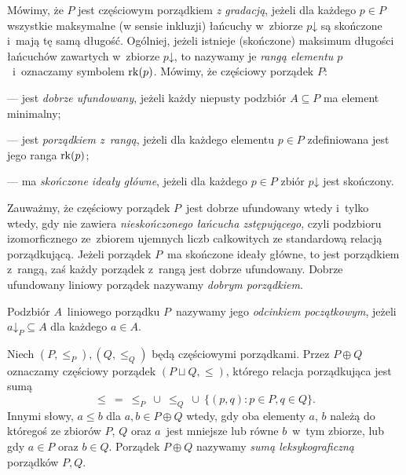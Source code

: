 Mówimy, że $P$ jest częściowym porządkiem \textit{z gradacją}, jeżeli dla każdego $p\in P$ wszystkie maksymalne (w sensie inkluzji) łańcuchy w~zbiorze $p\mathord{\downarrow}$ są skończone i~mają tę samą długość. Ogólniej, jeżeli istnieje (skończone) maksimum długości łańcuchów zawartych w~zbiorze $p\mathord{\downarrow}$, to nazywamy je \textit{rangą elementu $p$}~i~oznaczamy symbolem $\operatorname{rk}(p)$. Mówimy, że częściowy porządek $P$:\begin{compactitem}
\item[---] jest \textit{dobrze ufundowany}, jeżeli każdy niepusty podzbiór $A\subseteq P$ ma element minimalny;
\item[---] jest \textit{porządkiem z~rangą}, jeżeli dla każdego elementu $p\in P$ zdefiniowana jest jego ranga $\operatorname{rk}(p)$; 
\item[---] ma \textit{skończone ideały główne}, jeżeli dla każdego $p\in P$ zbiór $p\mathord{\downarrow}$ jest skończony.
\end{compactitem}

Zauważmy, że częściowy porządek $P$~jest dobrze ufundowany wtedy i~tylko wtedy, gdy nie zawiera \textit{nieskończonego łańcucha zstępującego}, czyli podzbioru izomorficznego ze~zbiorem ujemnych liczb całkowitych ze standardową relacją porządkującą. Jeżeli porządek $P$~ma skończone ideały główne, to jest porządkiem z~rangą, zaś każdy porządek z~rangą jest dobrze ufundowany. Dobrze ufundowany liniowy porządek nazywamy \textit{dobrym porządkiem}.

Podzbiór $A$~liniowego porządku $P$~nazywamy jego \textit{odcinkiem początkowym}, jeżeli $a\mathord{\downarrow}_{P}\subseteq A$ dla każdego $a\in A$.

Niech $(P,\leq_P),(Q,\leq_Q)$ będą częściowymi porządkami. Przez $P\oplus Q$ oznaczamy częściowy porządek $(P\sqcup Q,\leq)$, którego relacja porządkująca jest sumą \[\leq\ =\ \leq_P\ \cup\ \leq_Q\ \cup\ \{(p,q):p\in P, q\in Q\}.\] Innymi słowy, $a\leq b$ dla $a,b\in P\oplus Q$ wtedy, gdy oba elementy $a$, $b$ należą do któregoś ze zbiorów $P$, $Q$ oraz $a$~jest mniejsze lub równe $b$~w~tym zbiorze, lub gdy $a\in P$ oraz $b\in Q$. Porządek $P\oplus Q$ nazywamy \textit{sumą leksykograficzną} porządków $P, Q$.

